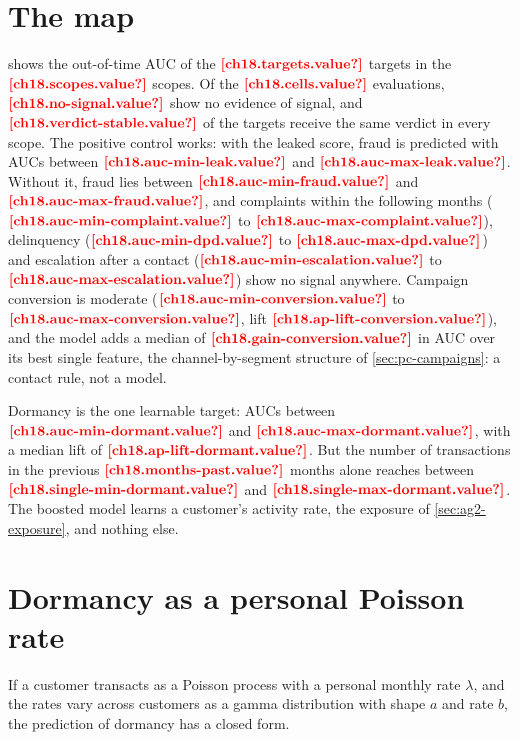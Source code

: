 \section{The map}\label{sec:le-map}

 shows the out-of-time AUC of the $\est{ch18.targets}{value}$ targets in the $\est{ch18.scopes}{value}$
scopes. Of the $\est{ch18.cells}{value}$ evaluations, $\est{ch18.no-signal}{value}$ show no evidence of signal, and
$\est{ch18.verdict-stable}{value}$ of the targets receive the same verdict in every scope. The positive control works: with the
leaked score, fraud is predicted with AUCs between $\est{ch18.auc-min-leak}{value}$ and $\est{ch18.auc-max-leak}{value}$.
Without it, fraud lies between $\est{ch18.auc-min-fraud}{value}$ and $\est{ch18.auc-max-fraud}{value}$, and complaints within the following months ($\est{ch18.auc-min-complaint}{value}$ to $\est{ch18.auc-max-complaint}{value}$), delinquency
($\est{ch18.auc-min-dpd}{value}$ to $\est{ch18.auc-max-dpd}{value}$) and escalation after a contact
($\est{ch18.auc-min-escalation}{value}$ to $\est{ch18.auc-max-escalation}{value}$) show no signal anywhere. Campaign conversion
is moderate ($\est{ch18.auc-min-conversion}{value}$ to $\est{ch18.auc-max-conversion}{value}$, lift $\est{ch18.ap-lift-conversion}{value}$),
and the model adds a median of $\est{ch18.gain-conversion}{value}$ in AUC over its best single feature, the channel-by-segment
structure of \cref{sec:pc-campaigns}: a contact rule, not a model.



Dormancy is the one learnable target: AUCs between $\est{ch18.auc-min-dormant}{value}$ and $\est{ch18.auc-max-dormant}{value}$,
with a median lift of $\est{ch18.ap-lift-dormant}{value}$. But the number of transactions in the previous $\est{ch18.months-past}{value}$ months alone
reaches between $\est{ch18.single-min-dormant}{value}$ and $\est{ch18.single-max-dormant}{value}$. The boosted model learns a
customer's activity rate, the exposure of \cref{sec:ag2-exposure}, and nothing else.

\section{Dormancy as a personal Poisson rate}\label{sec:le-poisson}

If a customer transacts as a Poisson process with a personal monthly rate $\lambda$, and the rates vary across customers as a
gamma distribution with shape $a$ and rate $b$, the prediction of dormancy has a closed form.

